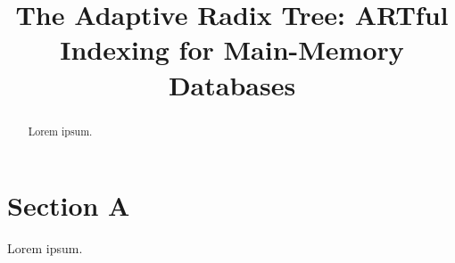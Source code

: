 \documentclass[acmtog]{acmart}
\begin{document}
\title{The Adaptive Radix Tree: ARTful Indexing for Main-Memory Databases}

\begin{abstract}
    Lorem ipsum.
\end{abstract}

\maketitle

\section{Section A}
Lorem ipsum.
\end{document}
